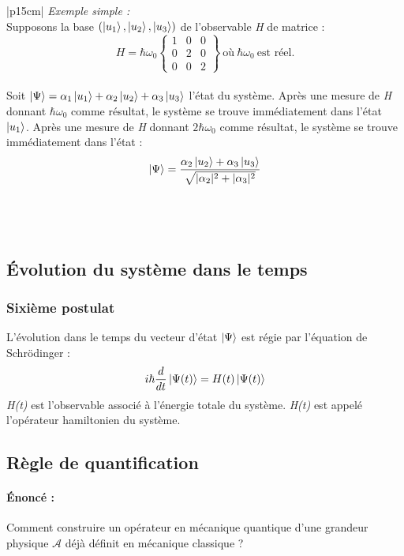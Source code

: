 \documentclass[12pt,a4paper,titlepage]{book}
\begin{document}
\begin{tabular}{|p{15cm}|}
\hline
\textit{Exemple simple :}\\
Supposons la base $(\ket{u_1}, \ket{u_2}, \ket{u_3})$ de l'observable \textit{H} de matrice :\\
\[
H = \hbar \omega_0
\left\lbrace
\begin{matrix}
1 & 0 & 0\\
0 & 2 & 0\\
0 & 0 & 2
\end{matrix}
\right\rbrace
~\text{où}~ \hbar \omega_0 ~\text{est réel.}
\]\\
Soit $\ket\Psi = \alpha_1 \ket{u_1} + \alpha_2 \ket{u_2} + \alpha_3 \ket{u_3}$ l'état du système. Après une mesure de \textit{H} donnant $\hbar \omega_0$ comme résultat, le système se trouve immédiatement dans l'état $\ket{u_1}$. Après une mesure de \textit{H} donnant $2 \hbar \omega_0$ comme résultat, le système se trouve immédiatement dans l'état :\\
\begin{equation*}
\ket\Psi = \frac{\alpha_2 \ket{u_2} + \alpha_3 \ket{u_3}}{\sqrt{\vert \alpha_2 \vert^2 + \vert \alpha_3 \vert^2}}
\end{equation*}\\

\hline
\end{tabular}\\

\subsection{Évolution du système dans le temps}
\subsubsection{Sixième postulat}
L'évolution dans le temps du vecteur d'état $\ket\Psi$ est régie par l'équation de Schrödinger :\\
\begin{equation*}
i \hbar \frac{d}{dt} \ket{\Psi(t)} = H(t) \ket{\Psi(t)}
\end{equation*}
\textit{H(t)} est l'observable associé à l'énergie totale du système. \textit{H(t)} est appelé l'opérateur hamiltonien du système.
\subsection{Règle de quantification}
\paragraph*{Énoncé :}
Comment construire un opérateur en mécanique quantique d'une grandeur physique $\mathcal{A}$ déjà définit en mécanique classique ?\\
\end{document}
